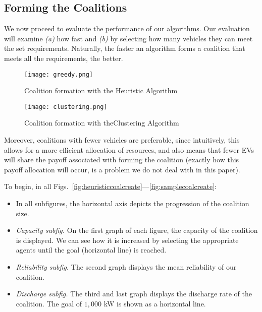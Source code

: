 \subsection{Forming the Coalitions}
We now proceed to evaluate the performance of our algorithms. Our evaluation will examine {\em (a)} how fast and {\em (b)} by selecting how many vehicles they can meet the set requirements. Naturally, the faster an algorithm forms a coalition that meets all the requirements, the better. 
\begin{figure}
	\centering
	\begin{minipage}{.5\textwidth}
		\centering
		\texttt{[image: greedy.png]}
		\caption{Coalition formation with the\newline
			Heuristic Algorithm \label{fig:heuristiccoalcreate}}
	\end{minipage}%
	\begin{minipage}{.5\textwidth}
		\texttt{[image: clustering.png]}
		\caption{Coalition formation with the\newline Clustering Algorithm\label{fig:clusteringcoalcreate}}
	\end{minipage}
\end{figure}
\vspace{-10pt}
Moreover, coalitions with fewer vehicles are preferable, since intuitively, this allows for a more efficient allocation of resources, and also means that fewer EVs will share the payoff associated with forming the coalition (exactly how this payoff allocation will occur, is a problem we do not deal with in this paper).

To begin, in all Figs.~\ref{fig:heuristiccoalcreate}---\ref{fig:samplecoalcreate}:
\begin{itemize}
	\item In all subfigures, the horizontal axis depicts the progression of the coalition size.
	\item {\em Capacity subfig.} On the first graph of each figure, the capacity of the coalition is displayed. We can see how it is increased by selecting the appropriate agents until the goal (horizontal line) is reached.
	\item {\em Reliability subfig.} The second graph displays the mean reliability of our coalition.
	\item {\em Discharge subfig.} The third and last graph displays the discharge rate of the coalition. The goal of $1,000$ kW is shown as a horizontal line.
\end{itemize}
